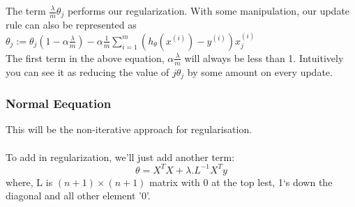     The term $\frac{\lambda}{m}\theta_{j}$ performs our regularization. With some manipulation, our update rule can also be represented as \\

    $ \theta_j := \theta_j(1 - \alpha\frac{\lambda}{m}) - \alpha\frac{1}{m}\sum_{i=1}^m(h_\theta(x^{(i)}) - y^{(i)})x_j^{(i)} $\\

    The first term in the above equation, $\alpha\frac{\lambda}{m}$ will always be less than 1. Intuitively you can see it as reducing the value of $j\theta_j$ by some amount on every update.

    \subsubsection{Normal Eequation}
      This will be the non-iterative approach for regularisation.\\\\
      To add in regularization, we'll just add another term:
      \begin{equation}
        \theta = X^T X + \lambda . L^{-1} X^T y
      \end{equation}
      where, L is $(n+1)\times(n+1)$ matrix with 0 at the top lest, 1`s down the diagonal and all other element '0'.
